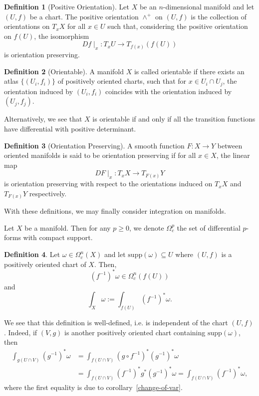 \documentclass[]{article}
\theoremstyle{definition}
\theoremstyle{definition}
\newtheorem{definition}{Definition}[section]
\begin{document}
\begin{definition}[Positive Orientation]
  Let \(X\) be an \(n\)-dimensional manifold and let \((U, f)\) be a chart. 
  The positive orientation \(\wedge^+\) on \((U, f)\) is the collection of 
  orientations on \(T_x X\) for all \(x \in U\) such that, considering the 
  positive orientation on \(f(U)\), the isomorphism 
  \[Df\mid_x : T_x U \to T_{f(x)}(f(U))\]
  is orientation preserving.
\end{definition}

\begin{definition}[Orientable]
  A manifold \(X\) is called orientable if there exists an atlas \(\{(U_i, f_i)\}\) 
  of positively oriented charts, such that for \(x \in U_i \cap U_j\), the 
  orientation induced by \((U_i, f_i)\) coincides with the orientation induced 
  by \((U_j, f_j)\).
\end{definition}

Alternatively, we see that \(X\) is orientable if and only if all the transition 
functions have differential with positive determinant.

\begin{definition}[Orientation Preserving]
  A smooth function \(F : X \to Y\) between oriented manifolds is said to be 
  orientation preserving if for all \(x \in X\), the linear map 
  \[DF\mid_x : T_x X \to T_{F(x)}Y\]
  is orientation preserving with respect to the orientations induced on 
  \(T_x X\) and \(T_{F(x)}Y\) respectively.
\end{definition}

With these definitions, we may finally consider integration on manifolds.

Let \(X\) be a manifold. Then for any \(p \ge 0\), we denote \(\Omega^p_c\) the 
set of differential \(p\)-forms with compact support.

\begin{definition}
  Let \(\omega \in \Omega^n_c(X)\) and let \(\text{supp}(\omega) \subseteq U\) 
  where \((U, f)\) is a positively oriented chart of \(X\). Then, 
  \[(f^{-1})^* \omega \in \Omega_c^n(f(U))\]
  and 
  \[\int_X \omega := \int_{f(U)}(f^{-1})^* \omega.\]
\end{definition}

We see that this definition is well-defined, i.e. is independent of the chart 
\((U, f)\). Indeed, if \((V, g)\) is another positively oriented chart containing 
\(\text{supp}(\omega)\), then 
\[\begin{split}
  \int_{g(U \cap V)}(g^{-1})^* \omega & = \int_{f(U \cap V)} (g \circ f^{-1})^*(g^{-1})^* \omega \\
  & = \int_{f(U \cap V)} (f^{-1})^* g^* (g^{-1})^* \omega = \int_{f(U \cap V)} (f^{-1})^* \omega,
\end{split}\]
where the first equality is due to corollary~\ref{change-of-var}.
\end{document}
